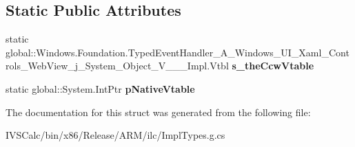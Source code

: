 \subsection*{Static Public Attributes}
\begin{DoxyCompactItemize}
\item 
\mbox{\label{struct_windows_1_1_foundation_1_1_typed_event_handler___a___windows___u_i___xaml___controls___weea5b22fbafcb30e85441c364b622cfb7_a2ad926cc056ef217b066e0e76351b9f6}} 
static global\+::\+Windows.\+Foundation.\+Typed\+Event\+Handler\+\_\+\+A\+\_\+\+Windows\+\_\+\+U\+I\+\_\+\+Xaml\+\_\+\+Controls\+\_\+\+Web\+View\+\_\+j\+\_\+\+System\+\_\+\+Object\+\_\+\+V\+\_\+\+\_\+\+\_\+\+Impl.\+Vtbl {\bfseries s\+\_\+the\+Ccw\+Vtable}
\item 
\mbox{\label{struct_windows_1_1_foundation_1_1_typed_event_handler___a___windows___u_i___xaml___controls___weea5b22fbafcb30e85441c364b622cfb7_af631ede4acf094306fa7088a4aa5bfe2}} 
static global\+::\+System.\+Int\+Ptr {\bfseries p\+Native\+Vtable}
\end{DoxyCompactItemize}


The documentation for this struct was generated from the following file\+:\begin{DoxyCompactItemize}
\item 
I\+V\+S\+Calc/bin/x86/\+Release/\+A\+R\+M/ilc/Impl\+Types.\+g.\+cs\end{DoxyCompactItemize}
